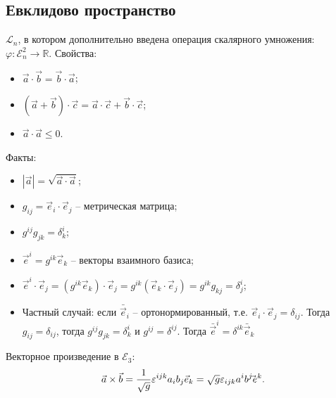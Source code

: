 \subsection{Евклидово пространство}

\begin{definition}
  $\mathcal{L}_n$, в котором дополнительно введена операция скалярного умножения: $\varphi: \mathcal{E}_n^2 \to \mathbb{R}$. 
  Свойства:
  \begin{itemize}
    \item $\vec{a} \cdot \vec{b} = \vec{b} \cdot \vec{a}$;
    \item $(\vec{a}+\vec{b}) \cdot \vec{c} = \vec{a} \cdot \vec{c} + \vec{b} \cdot \vec{c}$;
    \item $\vec{a} \cdot \vec{a} \leqslant 0$.
  \end{itemize}
  
  Факты:
  \begin{itemize}
    \item $|\vec{a}| = \sqrt{ \vec{a} \cdot \vec{a}}$;
    \item $g_{ij} = \vec{e}_i \cdot \vec{e}_j$ -- метрическая матрица;
    \item $g^{ij} g_{jk} = \delta^i_k$;
    \item $\vec{e}^i = g^{ik} \vec{e}_k$ -- векторы взаимного базиса;
    \item $\vec{e}^i \cdot \vec{e}_j = (g^{ik} \vec{e}_k) \cdot \vec{e}_j = g^{ik} (\vec{e}_k \cdot \vec{e}_j) = g^{ik} g_{kj} = \delta^i_j$;
    \item Частный случай: если $\bar{\vec{e}}_i$ -- ортонормированный, т.е.
      $\vec{e}_i \cdot \vec{e}_j = \delta_{ij}$. Тогда $g_{ij} = \delta_{ij}$, тогда
      $g^{ij} g_{jk} = \delta^i_k$ и $g^{ij} = \delta^{ij}$. Тогда $\bar{\vec{e}}^i = \delta^{ik} \bar{\vec{e}}_k$
  \end{itemize}
\end{definition}

Векторное произведение в $\mathcal{E}_3$:
\[
  \vec{a} \times \vec{b} = \dfrac{1}{\sqrt{g}} \varepsilon^{ijk} a_i b_j \vec{e}_k
  = \sqrt{g} \varepsilon_{ijk} a^i b^j \skew{-7}\vec{e}^k.
\]
